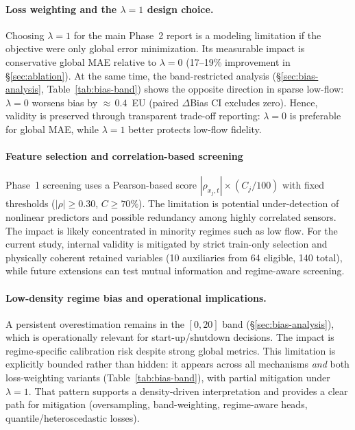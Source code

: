 \paragraph{Loss weighting and the $\lambda{=}1$ design choice.}
Choosing $\lambda{=}1$ for the main Phase~2 report is a modeling limitation if the objective were only global error minimization. Its measurable impact is conservative global MAE relative to $\lambda{=}0$ (17--19\% improvement in \S\ref{sec:ablation}). At the same time, the band-restricted analysis (\S\ref{sec:bias-analysis}, Table~\ref{tab:bias-band}) shows the opposite direction in sparse low-flow: $\lambda{=}0$ worsens bias by ${\approx}\,0.4$~EU (paired $\Delta$Bias CI excludes zero). Hence, validity is preserved through transparent trade-off reporting: $\lambda{=}0$ is preferable for global MAE, while $\lambda{=}1$ better protects low-flow fidelity.

\paragraph{Feature selection and correlation-based screening}
Phase~1 screening uses a Pearson-based score $|\rho_{x_j,t}|\times(C_j/100)$ with fixed thresholds ($|\rho|\ge 0.30$, $C\ge 70\%$). The limitation is potential under-detection of nonlinear predictors and possible redundancy among highly correlated sensors. The impact is likely concentrated in minority regimes such as low flow. For the current study, internal validity is mitigated by strict train-only selection and physically coherent retained variables (10 auxiliaries from 64 eligible, 140 total), while future extensions can test mutual information and regime-aware screening.

\paragraph{Low-density regime bias and operational implications.}
A persistent overestimation remains in the $[0,20]$ band (\S\ref{sec:bias-analysis}), which is operationally relevant for start-up/shutdown decisions. The impact is regime-specific calibration risk despite strong global metrics. This limitation is explicitly bounded rather than hidden: it appears across all mechanisms \emph{and} both loss-weighting variants (Table~\ref{tab:bias-band}), with partial mitigation under $\lambda{=}1$. That pattern supports a density-driven interpretation and provides a clear path for mitigation (oversampling, band-weighting, regime-aware heads, quantile/heteroscedastic losses).

